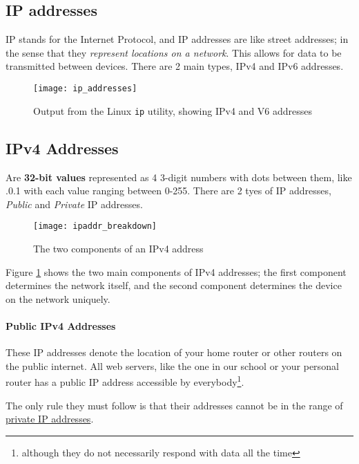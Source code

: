 \documentclass[../main.tex]{subfiles}
\begin{document}
\subsection{IP addresses}
\label{2:sec:ip}

IP stands for the Internet Protocol, and IP addresses are like street addresses; in the sense that they \emph{represent locations on a network}. This allows for data to be transmitted between devices. There are 2 main types, IPv4 and IPv6 addresses.

\begin{figure}[h]
    \centering
    \texttt{[image: ip\_addresses]}
    \caption{Output from the Linux \texttt{ip} utility, showing IPv4 and V6 addresses}
\end{figure}

\subsection{IPv4 Addresses}

Are \textbf{32-bit values} represented as 4 3-digit numbers with dots between them, like {.0.1} with each value ranging between 0-255. There are 2 tyes of IP addresses, \emph{Public} and \emph{Private} IP addresses.

\begin{figure}[h]
    \centering
    \texttt{[image: ipaddr\_breakdown]}
    \caption{The two components of an IPv4 address}
    \label{fig:ipaddr_breakdown}
\end{figure}

Figure \ref{fig:ipaddr_breakdown} shows the two main components of IPv4 addresses; the first component determines the network itself, and the second component determines the device on the network uniquely.

\paragraph{Public IPv4 Addresses}

These IP addresses denote the location of your home router or other routers on the public internet. All web servers, like the one in our school or your personal router has a public IP address accessible by everybody\footnote{although they do not necessarily respond with data all the time}.

The only rule they must follow is that their addresses cannot be in the range of \hyperref[tab:private_ip_classes]{private IP addresses}.
\end{document}
